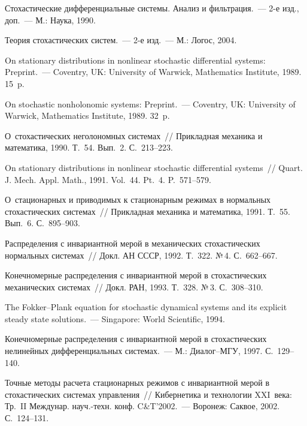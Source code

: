 \begin{multicols}{2}
{\small\frenchspacing
{%
\begin{thebibliography}{99}
 Стохастические дифференциальные системы. 
Анализ и фильтрация.~--- 2-е изд., доп.~--- М.: Наука, 1990.

 Теория стохастических систем.~--- 2-е изд.~--- М.: Логос,  2004.

 On stationary distributions in nonlinear 
stochastic differential systems: Preprint.~--- Coventry, UK: 
University of Warwick, Mathematics Institute, 1989. 15~p.

 On stochastic nonholonomic systems: Preprint.~--- 
Coventry, UK: University of Warwick, Mathematics Institute, 1989. 32~p.

 О~стохастических неголономных системах~// 
Прикладная механика и математика, 1990. Т.~54. Вып.~2. С.~213--223.

 On stationary distributions in 
nonlinear stochastic differential systems~// Quart. J. Mech. Appl. Math., 1991. Vol.~44.  
Pt.~4.  P.~571--579.

 О~стационарных и приводимых к стационарным 
режимах в нормальных стохастических системах~// 
Прикладная механика и математика, 1991. Т.~55. Вып.~6. С.~895--903.

 Распределения с инвариантной мерой в механических 
стохастических нормальных сис\-те\-мах~// Докл. АН СССР, 1992. Т.~322. №\,4. С.~662--667.

 Конечномерные распределения с инвариантной мерой в стохастических 
механических сис\-те\-мах~// Докл. РАН, 1993. Т.~328. №\,3. С.~308--310.

 The Fokker--Plank equation for stochastic dynamical systems 
and its explicit steady state solutions.~--- Singapore: World Scientific,  1994.

 Конечномерные распределения с инвариантной мерой в 
стохастических нелинейных дифференциальных системах.~--- М.: Диалог--МГУ, 1997. С.~129--140.

Точные методы расчета стационарных режимов с инвариантной мерой в стохастических 
сис\-те\-мах управ\-ле\-ния~// Кибернетика и технологии XXI~ве\-ка: Тр.\ II Междунар. 
науч.-техн. конф. C\&T'2002.~--- Воронеж: Саквое, 2002. С.~124--131.


\end{thebibliography}}}
\end{multicols}
